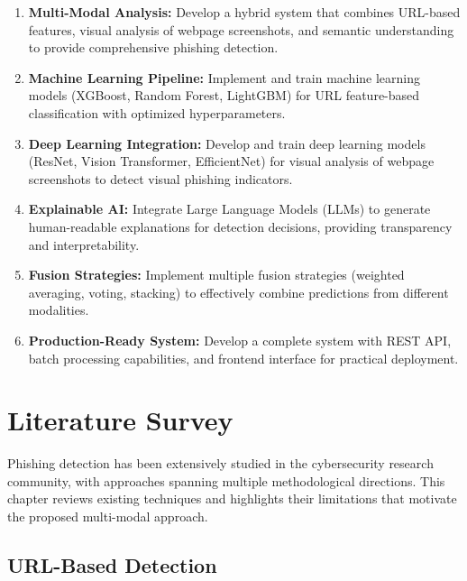 \documentclass[12pt,a4paper]{report}
\begin{document}
\begin{enumerate}
    \item \textbf{Multi-Modal Analysis:} Develop a hybrid system that combines URL-based features, visual analysis of webpage screenshots, and semantic understanding to provide comprehensive phishing detection.
    
    \item \textbf{Machine Learning Pipeline:} Implement and train machine learning models (XGBoost, Random Forest, LightGBM) for URL feature-based classification with optimized hyperparameters.
    
    \item \textbf{Deep Learning Integration:} Develop and train deep learning models (ResNet, Vision Transformer, EfficientNet) for visual analysis of webpage screenshots to detect visual phishing indicators.
    
    \item \textbf{Explainable AI:} Integrate Large Language Models (LLMs) to generate human-readable explanations for detection decisions, providing transparency and interpretability.
    
    \item \textbf{Fusion Strategies:} Implement multiple fusion strategies (weighted averaging, voting, stacking) to effectively combine predictions from different modalities.
    
    \item \textbf{Production-Ready System:} Develop a complete system with REST API, batch processing capabilities, and frontend interface for practical deployment.
\end{enumerate}

\chapter{Literature Survey}

Phishing detection has been extensively studied in the cybersecurity research community, with approaches spanning multiple methodological directions. This chapter reviews existing techniques and highlights their limitations that motivate the proposed multi-modal approach.

\section{URL-Based Detection}
\end{document}
